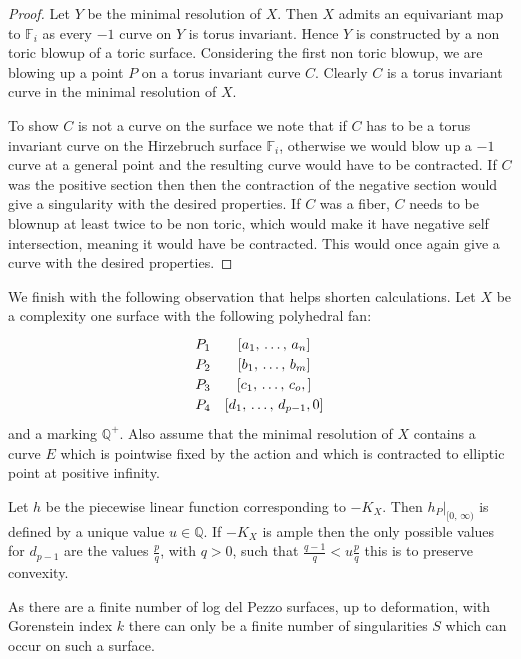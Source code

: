 \documentclass[12pt]{amsart}
\theoremstyle{plain}
\newcommand{\mb}[1]{\mathbb{#1}}
\begin{document}
\begin{proof}
Let $Y$ be the minimal resolution of $X$. Then $X$ admits an equivariant map to $\mb{F}_i$ as every $-1$ curve on $Y$ is torus invariant. Hence $Y$ is constructed by a non toric blowup of a toric surface. Considering the first non toric blowup, we are blowing up a point $P$ on a torus invariant curve $C$. Clearly $C$ is a torus invariant curve in the minimal resolution of $X$.

To show $C$ is not a curve on the surface we note that if $C$ has to be a torus invariant curve on the Hirzebruch surface $\mb{F}_i$, otherwise we would blow up a $-1$ curve at a general point and the resulting curve would have to be contracted. If $C$ was the positive section then then the contraction of the negative section would give a singularity with the desired properties. If $C$ was a fiber, $C$ needs to be blownup at least twice to be non toric, which would make it have negative self intersection, meaning it would have be contracted. This would once again give a curve with the desired properties.
\end{proof}



We finish with the following observation that helps shorten calculations.
Let $X$ be a complexity one surface with the following polyhedral fan:
\[\def\arraystretch{1.2}
\begin{array}{cc}
P_1 & \left[ a_1, \, \dots , \, a_n \right] \\ 
P_2 & \left[b_1 , \, \dots, \, b_m \right] \\
P_3 & \left[c_1, \, \dots, \, c_o, \right] \\
P_4 & \left[d_1, \, \dots, \, d_{p-1}, 0\right]  \\
\end{array}
\]
and a marking $\mb{Q}^+$.
Also assume that the minimal resolution of $X$ contains a curve $E$ which is pointwise fixed by the action and which is contracted to elliptic point at positive infinity.

Let $h$ be the piecewise linear function corresponding to $-K_X$. Then $h_P|_{[0, \, \infty)}$ is defined by a unique value $u \in \mb{Q}$. If $-K_X$ is ample then the only possible values for $d_{p-1}$ are the values $\frac{p}{q}$, with $q >0$, such that $\frac{q-1}{q} < u\frac{p}{q}$ this is to preserve convexity. 


As there are a finite number of log del Pezzo surfaces, up to deformation, with Gorenstein index $k$ there can only be a finite number of singularities $S$ which can occur on such a surface. 
\end{document}
